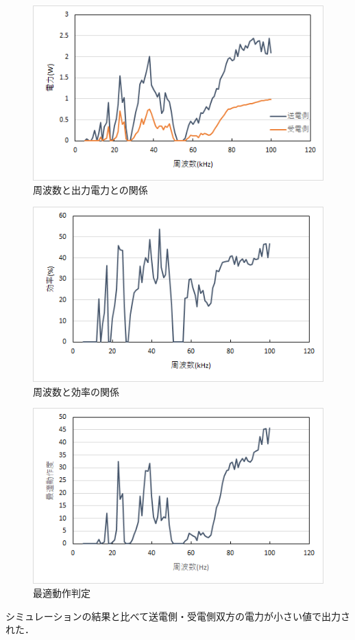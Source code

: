 \documentclass[12pt]{jarticle}
\begin{document}
 \begin{figure}[H]
	\centering
	\includegraphics[]{not_nouritu_w.png}
	\caption{周波数と出力電力との関係}
	\label{fig:not_nourituw}
\end{figure}
\begin{figure}[H]
	\centering
	\includegraphics[]{notkouritu.png}
	\caption{周波数と効率の関係}
	\label{fig:not_nouritu_kou}
\end{figure}
\begin{figure}[H]
	\centering
	\includegraphics[]{not_nouritu_dousa.png}
	\caption{最適動作判定}
	\label{fig:not_nouritu_dousa}
\end{figure}
シミュレーションの結果と比べて送電側・受電側双方の電力が小さい値で出力された．
\end{document}
